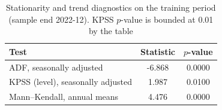 \begin{table}[t]
\centering
\begin{threeparttable}
\caption{Stationarity and trend diagnostics on the training period (sample end 2022-12). KPSS $p$-value is bounded at 0.01 by the table}
\label{tab:diag}
\begin{tabular}{lcc}
\toprule
Test & Statistic & $p$-value \\
\midrule
ADF, seasonally adjusted & -6.868 & 0.0000 \\
KPSS (level), seasonally adjusted & 1.987 & 0.0100 \\
Mann--Kendall, annual means & 4.476 & 0.0000 \\
\bottomrule
\end{tabular}
\end{threeparttable}
\end{table}
